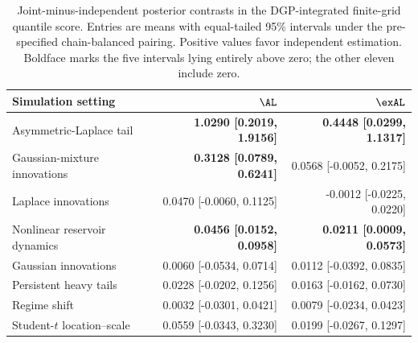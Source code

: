 \begin{table}[!htbp]
\centering
\small
\begin{tabular}{@{}>{\raggedright\arraybackslash}p{}rr@{}}
\toprule
Simulation setting & \(\AL\) & \(\exAL\) \\
\midrule
Asymmetric-Laplace tail & \textbf{1.0290 [0.2019, 1.9156]} & \textbf{0.4448 [0.0299, 1.1317]} \\
Gaussian-mixture innovations & \textbf{0.3128 [0.0789, 0.6241]} & 0.0568 [-0.0052, 0.2175] \\
Laplace innovations & 0.0470 [-0.0060, 0.1125] & -0.0012 [-0.0225, 0.0220] \\
Nonlinear reservoir dynamics & \textbf{0.0456 [0.0152, 0.0958]} & \textbf{0.0211 [0.0009, 0.0573]} \\
Gaussian innovations & 0.0060 [-0.0534, 0.0714] & 0.0112 [-0.0392, 0.0835] \\
Persistent heavy tails & 0.0228 [-0.0202, 0.1256] & 0.0163 [-0.0162, 0.0730] \\
Regime shift & 0.0032 [-0.0301, 0.0421] & 0.0079 [-0.0234, 0.0423] \\
Student-\(t\) location--scale & 0.0559 [-0.0343, 0.3230] & 0.0199 [-0.0267, 0.1297] \\
\bottomrule
\end{tabular}
\caption{Joint-minus-independent posterior contrasts in the DGP-integrated finite-grid quantile score. Entries are means with equal-tailed 95\% intervals under the pre-specified chain-balanced pairing. Positive values favor independent estimation. Boldface marks the five intervals lying entirely above zero; the other eleven include zero.}
\label{tab:supp-joint-qdesn-shared-backbone-contrasts}
\end{table}
